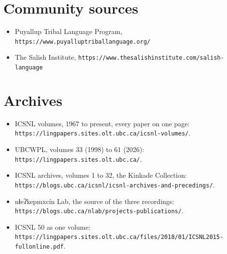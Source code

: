 \section{Community sources}

\begin{itemize}
\item Puyallup Tribal Language Program, \texttt{https://www.puyalluptriballanguage.org/}
\item The Salish Institute, \texttt{https://www.thesalishinstitute.com/salish-language}
\end{itemize}

\section{Archives}

\begin{itemize}
\item ICSNL volumes, 1967 to present, every paper on one page: \texttt{https://lingpapers.sites.olt.ubc.ca/icsnl-volumes/}.
\item UBCWPL, volumes 33 (1998) to 61 (2026): \texttt{https://lingpapers.sites.olt.ubc.ca/}.
\item ICSNL archives, volumes 1 to 32, the Kinkade Collection: \texttt{https://blogs.ubc.ca/icsnl/icsnl-archives-and-precedings/}.
\item nɬeʔkepmxcín Lab, the source of the three recordings: \texttt{https://blogs.ubc.ca/nlab/projects-publications/}.
\item ICSNL 50 as one volume: \texttt{https://lingpapers.sites.olt.ubc.ca/files/2018/01/ICSNL2015-fullonline.pdf}.
\end{itemize}

